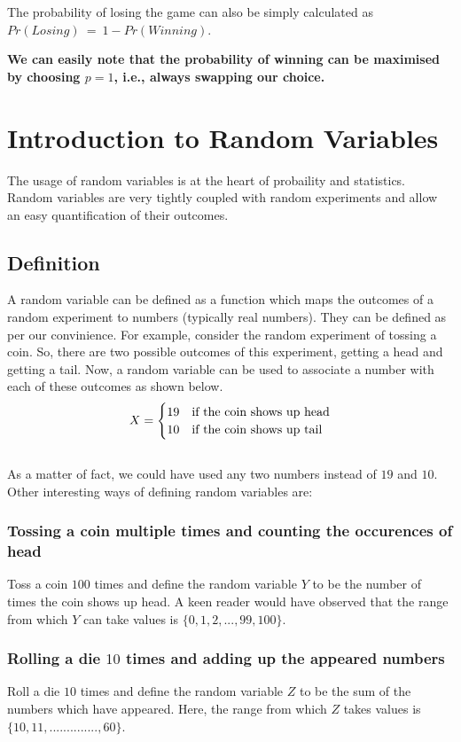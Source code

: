 \documentclass{book}
\begin{document}
The probability of losing the game can also be simply calculated as $Pr(Losing)\ =\ 1-Pr(Winning)$.

\textbf{We can easily note that the probability of winning can be maximised by choosing $p=1$, i.e., always swapping our choice.}


\section{Introduction to Random Variables}

The usage of random variables is at the heart of probaility and statistics. Random variables are very tightly coupled with random experiments and allow an easy quantification of their outcomes. 

\subsection{Definition}
A random variable can be defined as a function which maps the outcomes of a random experiment to numbers (typically real numbers). They can be defined as per our convinience. For example, consider the random experiment of tossing a coin. So, there are two possible outcomes of this experiment, getting a head and getting a tail. Now, a random variable can be used to associate a number with each of these outcomes as shown below. 
\[
X = \left\{\def\arraystretch{1.2}%
\begin{array}{@{}c@{\quad}l@{}}
19 & \text{if the coin shows up head}\\
10 & \text{if the coin shows up tail}\\
\end{array}\right.
\]\\

As a matter of fact, we could have used any two numbers instead of $19$ and $10$. Other interesting ways of defining random variables are:
 
\subsubsection{Tossing a coin multiple times and counting the occurences of head}
Toss a coin $100$ times and define the random variable $Y$ to be the number of times the coin shows up head. A keen reader would have observed that the range from which $Y$ can take values is $\{0,1,2,...,99,100\}$. 

\subsubsection{Rolling a die $10$ times and adding up the appeared numbers}
Roll a die $10$ times and define the random variable $Z$ to be the sum of the numbers which have appeared. Here, the range from which $Z$ takes values is $\{10,11,..............,60\}$. 
\end{document}
